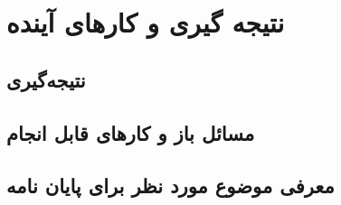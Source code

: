 \chapter{نتیجه گیری و کارهای آینده}
\thispagestyle{empty}
\section{نتیجه‌گیری}

\section{مسائل باز و کارهای قابل انجام}
\section{معرفی موضوع مورد نظر برای پایان نامه}